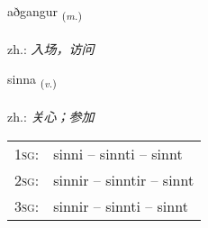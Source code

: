 \documentclass[frontgrid, backgrid]{flacards}\usepackage[]{graphicx}\usepackage[]{xcolor}
\begin{document}
\renewcommand{\flhead}{\vskip5pt \fboxsep=0pt {\small\bfseries\footnotesize Nafnorð | 名词}}
\renewcommand{\fcfoot}{\vskip5pt \fboxsep=0pt \hspace{2pt}{\small\bfseries\footnotesize 1K}}

\renewcommand{\blhead}{\vskip5pt {\small\bfseries\footnotesize Nafnorð | 名词 }}
\renewcommand{\bcfoot}{\vskip5pt \hspace{2pt}{\small\bfseries\footnotesize 1K}}


{aðgangur \small{\textsubscript{(\textit{m.})}} \\[1ex] %
\textphonetic{[aðkauŋkʏr]} \\
zh.: \emph{入场，访问} \\  [2ex]
\renewcommand*{\arraystretch}{0.8}
}

\renewcommand{\flhead}{\vskip5pt \fboxsep=0pt {\small\bfseries\footnotesize Sagnorð | 动词}}
\renewcommand{\fcfoot}{\vskip5pt \fboxsep=0pt \hspace{2pt}{\small\bfseries\footnotesize 1K}}

\renewcommand{\blhead}{\vskip5pt {\small\bfseries\footnotesize Sagnorð | 动词 }}
\renewcommand{\bcfoot}{\vskip5pt \hspace{2pt}{\small\bfseries\footnotesize 1K}}


{sinna \small{\textsubscript{(\textit{v.})}} \\[1ex] %
\textphonetic{[sɪna]} \\
zh.: \emph{关心；参加} \\  [2ex]
\renewcommand*{\arraystretch}{0.8}
\begin{tabular}{p{1cm}l}
\textsc{1sg}: & sinni -- sinnti -- sinnt \\ 
\textsc{2sg}: & sinnir -- sinntir -- sinnt \\ 
\textsc{3sg}: & sinnir -- sinnti -- sinnt \\ 
\end{tabular}
}
\end{document}
